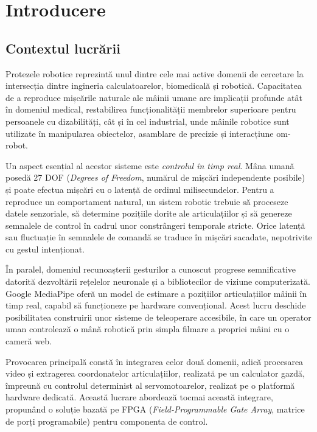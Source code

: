 \chapter{Introducere}\label{ch:intro}
\pagestyle{fancy}

\section{Contextul lucrării}
\label{sec:intro-context}

Protezele robotice reprezintă unul dintre cele mai active domenii de cercetare la
intersecția dintre ingineria calculatoarelor, biomedicală și robotică. Capacitatea de
a reproduce mișcările naturale ale mâinii umane are implicații profunde atât în
domeniul medical, restabilirea funcționalității membrelor superioare pentru
persoanele cu dizabilități, cât și în cel industrial, unde mâinile robotice sunt
utilizate în manipularea obiectelor, asamblare de precizie și interacțiune
om-robot.

Un aspect esențial al acestor sisteme este \textit{controlul în timp real}. Mâna
umană posedă 27 DOF (\textit{Degrees of Freedom}, numărul de mișcări independente
posibile) și poate efectua mișcări cu o latență de ordinul milisecundelor. Pentru
a reproduce un comportament natural, un sistem robotic trebuie să proceseze datele
senzoriale, să determine pozițiile dorite ale articulațiilor și să genereze
semnalele de control în cadrul unor constrângeri temporale stricte. Orice latență
sau fluctuație în semnalele de comandă se traduce în mișcări sacadate, nepotrivite
cu gestul intenționat.

În paralel, domeniul recunoașterii gesturilor a cunoscut progrese semnificative
datorită dezvoltării rețelelor neuronale și a bibliotecilor de viziune
computerizată. Google MediaPipe \cite{mediapipe2019} oferă un model de estimare a
pozițiilor articulațiilor mâinii în timp real, capabil să funcționeze pe
hardware convențional. Acest lucru deschide posibilitatea construirii unor
sisteme de teleoperare accesibile, în care un operator uman controlează o mână
robotică prin simpla filmare a propriei mâini cu o cameră web.

Provocarea principală constă în integrarea celor două domenii, adică procesarea video
și extragerea coordonatelor articulațiilor, realizată pe un calculator gazdă, împreună cu
controlul determinist al servomotoarelor, realizat pe o platformă hardware dedicată. Această lucrare abordează tocmai
această integrare, propunând o soluție bazată pe FPGA (\textit{Field-Programmable
Gate Array}, matrice de porți programabile) pentru componenta de control.

